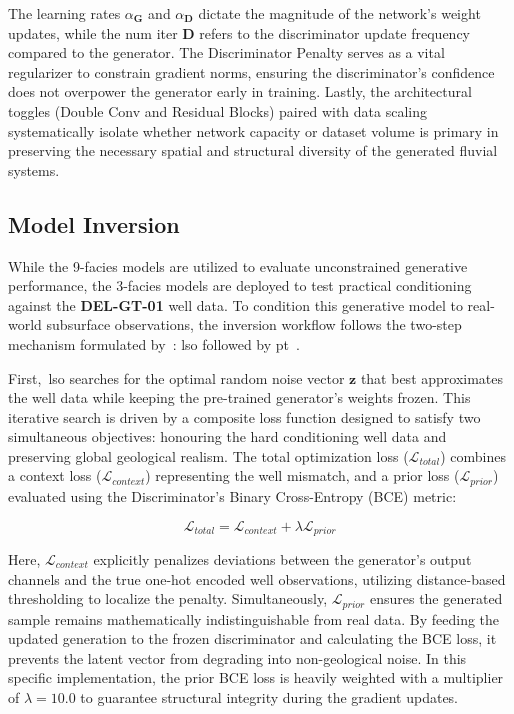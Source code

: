 The learning rates $\alpha_{\mathbf{G}}$ and $\alpha_{\mathbf{D}}$ dictate the magnitude of the network's weight updates, while the num iter $\mathbf{D}$ refers to the discriminator update frequency compared to the generator. The Discriminator Penalty serves as a vital regularizer to constrain gradient norms, ensuring the discriminator's confidence does not overpower the generator early in training. Lastly, the architectural toggles (Double Conv and Residual Blocks) paired with data scaling systematically isolate whether network capacity or dataset volume is primary in preserving the necessary spatial and structural diversity of the generated fluvial systems.

\subsection{Model Inversion}
While the 9-facies models are utilized to evaluate unconstrained generative performance, the 3-facies models are deployed to test practical conditioning against the \textbf{DEL-GT-01} well data. To condition this generative model to real-world subsurface observations, the inversion workflow follows the two-step mechanism formulated by~\textcite{rongier2025btowards}: \gls{lso} followed by \gls{pt}~\parencite{roich2022pivotal}. 

First,~\gls{lso} searches for the optimal random noise vector $\mathbf{z}$ that best approximates the well data while keeping the pre-trained generator's weights frozen. This iterative search is driven by a composite loss function designed to satisfy two simultaneous objectives: honouring the hard conditioning well data and preserving global geological realism. The total optimization loss ($\mathcal{L}_{total}$) combines a context loss ($\mathcal{L}_{context}$) representing the well mismatch, and a prior loss ($\mathcal{L}_{prior}$) evaluated using the Discriminator's Binary Cross-Entropy (BCE) metric:

\begin{equation}
    \mathcal{L}_{total} = \mathcal{L}_{context} + \lambda \mathcal{L}_{prior}
\end{equation}

Here, $\mathcal{L}_{context}$ explicitly penalizes deviations between the generator's output channels and the true one-hot encoded well observations, utilizing distance-based thresholding to localize the penalty. Simultaneously, $\mathcal{L}_{prior}$ ensures the generated sample remains mathematically indistinguishable from real data. By feeding the updated generation to the frozen discriminator and calculating the BCE loss, it prevents the latent vector from degrading into non-geological noise. In this specific implementation, the prior BCE loss is heavily weighted with a multiplier of $\lambda = 10.0$ to guarantee structural integrity during the gradient updates.

